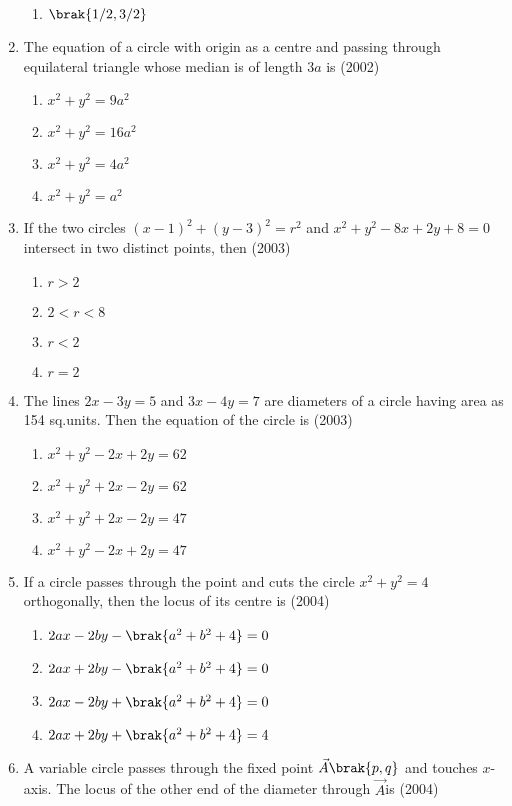 \begin{enumerate}
\begin{enumerate}
\item$\brak{1/2, 3/2}$
\end{enumerate}
\item The equation of a circle with origin as a centre and passing through equilateral triangle whose median is of length $3a$ is \hfill(2002)
\begin{enumerate}
\item$x^2+y^2=9a^2$
\item$x^2+y^2=16a^2$
\item$x^2+y^2=4a^2$
\item$x^2+y^2=a^2$
\end{enumerate}
\item If the two circles $(x-1)^2+(y-3)^2=r^2$ and $x^2+y^2-8x+2y+8=0$ intersect in two distinct points,  then \hfill(2003)
\begin{enumerate}
\item$r>2$
\item$2<r<8$
\item$r<2$
\item$r=2$
\end{enumerate}
\item The lines $2x-3y=5$ and $3x-4y=7$ are diameters of a circle having area as 154 sq.units. Then the equation of the circle is
\hfill{(2003)}
\begin{enumerate}
\item $x^2+y^2-2x+2y=62$
\item $x^2+y^2+2x-2y=62$
\item $x^2+y^2+2x-2y=47$
\item $x^2+y^2-2x+2y=47$
\end{enumerate}
\item If a circle passes through the point  and cuts the circle $x^2+y^2=4$ orthogonally,  then the locus of its centre is
\hfill{(2004)}
\begin{enumerate}
\item $2ax-2by-\brak{a^2+b^2+4}=0$
\item $2ax+2by-\brak{a^2+b^2+4}=0$
\item $2ax-2by+\brak{a^2+b^2+4}=0$
\item $2ax+2by+\brak{a^2+b^2+4}=4$
\end{enumerate}
\item A variable circle passes through the fixed point $\vec{A}\brak{p, q}$ and touches $x$-axis. The locus of the other end of the diameter through $\vec{A}$is
\hfill{(2004)}
\begin{multicols}{2}
\begin{enumerate}

\end{enumerate}
\end{multicols}
\end{enumerate}
